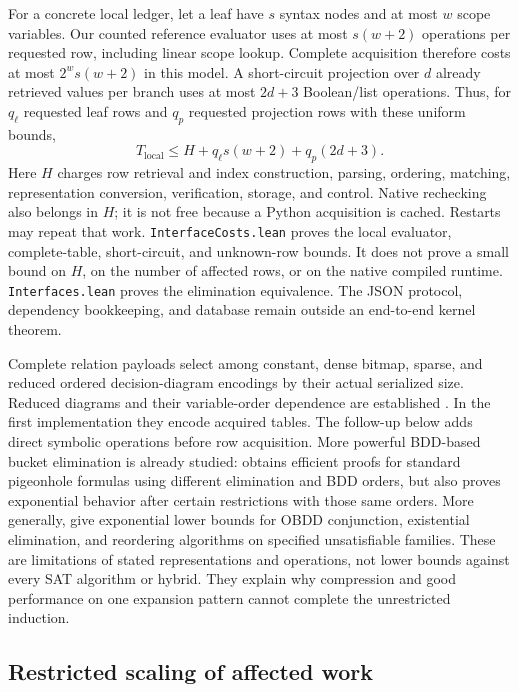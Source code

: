 \documentclass[11pt,a4paper]{article}
\numberwithin{equation}{section}
\theoremstyle{plain}
\theoremstyle{definition}
\theoremstyle{remark}
\begin{document}
For a concrete local ledger, let a leaf have $s$ syntax nodes and at most $w$ scope variables. Our counted reference evaluator uses at most $s(w+2)$ operations per requested row, including linear scope lookup. Complete acquisition therefore costs at most $2^w s(w+2)$ in this model. A short-circuit projection over $d$ already retrieved values per branch uses at most $2d+3$ Boolean/list operations. Thus, for $q_\ell$ requested leaf rows and $q_p$ requested projection rows with these uniform bounds,
\begin{equation}
T_{\mathrm{local}}\leq H+q_\ell s(w+2)+q_p(2d+3).
\label{eq:lazy-interface-budget}
\end{equation}
Here $H$ charges row retrieval and index construction, parsing, ordering, matching, representation conversion, verification, storage, and control. Native rechecking also belongs in $H$; it is not free because a Python acquisition is cached. Restarts may repeat that work. \texttt{InterfaceCosts.lean} proves the local evaluator, complete-table, short-circuit, and unknown-row bounds. It does not prove a small bound on $H$, on the number of affected rows, or on the native compiled runtime. \texttt{Interfaces.lean} proves the elimination equivalence. The JSON protocol, dependency bookkeeping, and database remain outside an end-to-end kernel theorem.

Complete relation payloads select among constant, dense bitmap, sparse, and reduced ordered decision-diagram encodings by their actual serialized size. Reduced diagrams and their variable-order dependence are established \citep{bryant1986bdd}. In the first implementation they encode acquired tables. The follow-up below adds direct symbolic operations before row acquisition. More powerful BDD-based bucket elimination is already studied: \citet{mengel2023bdd} obtains efficient proofs for standard pigeonhole formulas using different elimination and BDD orders, but also proves exponential behavior after certain restrictions with those same orders. More generally, \citet{itsykson2024limits} give exponential lower bounds for OBDD conjunction, existential elimination, and reordering algorithms on specified unsatisfiable families. These are limitations of stated representations and operations, not lower bounds against every SAT algorithm or hybrid. They explain why compression and good performance on one expansion pattern cannot complete the unrestricted induction.

\subsection{Restricted scaling of affected work}
\label{sec:affected-scaling}
\end{document}
